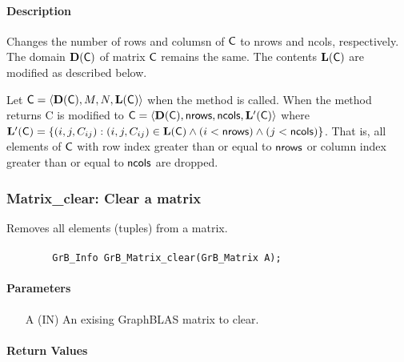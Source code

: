 \paragraph{Description}

Changes the number of rows and columsn of ${\sf C}$ to {\sf nrows} and {\sf ncols}, respectively. The domain
$\mathbf{D}({\sf C})$ of matrix ${\sf C}$ remains the same. The
contents $\mathbf{L}({\sf C})$ are modified as described below.

Let ${\sf C} = \langle \mathbf{D}({\sf C}), M, N, \mathbf{L}({\sf C})
\rangle$ when the method is called. When the method returns {\sf C} is modified to ${\sf C}
= \langle \mathbf{D}({\sf C}), {\sf nrows}, {\sf ncols}, \mathbf{L'}({\sf C})
\rangle$ where $\mathbf{L'}({\sf C}) = \{(i,j,C_{ij}) : (i,j,C_{ij}) \in
\mathbf{L}({\sf C}) \wedge (i < {\sf nrows}) \wedge (j < {\sf ncols})\}$. That is, all elements
of ${\sf C}$ with row index greater than or equal to 
${\sf nrows}$ or column index greater than or equal to ${\sf ncols}$ are dropped.

\subsubsection{{\sf Matrix\_clear}: Clear a matrix}

Removes all elements (tuples) from a matrix.

\paragraph{\syntax}

\begin{verbatim}
        GrB_Info GrB_Matrix_clear(GrB_Matrix A);
\end{verbatim}

\paragraph{Parameters}

\begin{itemize}[leftmargin=1.1in]
    \item[{\sf A}] ({\sf IN}) An exising GraphBLAS matrix to clear.
\end{itemize}

\paragraph{Return Values}

